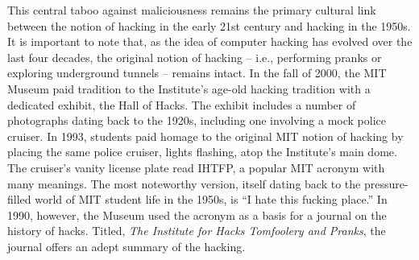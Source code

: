 


\ifdefined\eng
This central taboo against maliciousness remains the primary cultural link between the notion of hacking in the early 21st century and hacking in the 1950s. %
It is important to note that, as the idea of computer hacking has evolved over the last four decades, the original notion of hacking -- i.e., performing pranks or exploring underground tunnels -- remains intact. In the fall of 2000, the MIT Museum paid tradition to the Institute's age-old hacking tradition with a dedicated exhibit, the Hall of Hacks. The exhibit includes a number of photographs dating back to the 1920s, including one involving a mock police cruiser. In 1993, students paid homage to the original MIT notion of hacking by placing the same police cruiser, lights flashing, atop the Institute's main dome. The cruiser's vanity license plate read IHTFP, a popular MIT acronym with many meanings. The most noteworthy version, itself dating back to the pressure-filled world of MIT student life in the 1950s, is ``I hate this fucking place.'' In 1990, however, the Museum used the acronym as a basis for a journal on the history of hacks. Titled, \textit{The Institute for Hacks Tomfoolery and Pranks}, the journal offers an adept summary of the hacking.
\fi

